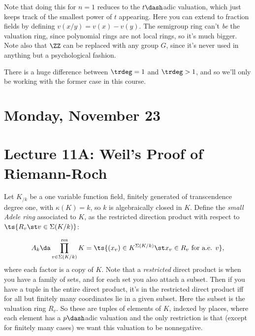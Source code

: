 Note that doing this for \(n=1\) reduces to the \(t\dash\)adic
valuation, which just keeps track of the smallest power of \(t\)
appearing. Here you can extend to fraction fields by defining
\(v(x/y) = v(x) - v(y)\). The semigroup ring can't \emph{be} the
valuation ring, since polynomial rings are not local rings, so it's much
bigger. Note also that \(\ZZ\) can be replaced with any group \(G\),
since it's never used in anything but a psychological fashion.

\begin{slogan}

There is a huge difference between \(\trdeg = 1\) and \(\trdeg > 1\),
and so we'll only be working with the former case in this course.

\end{slogan}

\hypertarget{monday-november-23}{%
\section{Monday, November 23}\label{monday-november-23}}

\hypertarget{lecture-11a-weils-proof-of-riemann-roch}{%
\section{Lecture 11A: Weil's Proof of
Riemann-Roch}\label{lecture-11a-weils-proof-of-riemann-roch}}

Let \(K_{/k}\) be a one variable function field, finitely generated of
transcendence degree one, with \(\kappa(K) = k\), so \(k\) is
algebraically closed in \(K\). Define the \emph{small Adele ring}
associated to \(K\), as the restricted direction product with respect to
\(\ts{R_v \st v\in \Sigma(K/k)}\):

\begin{align*}
A_k \da \prod^{\text{res}}_{v\in \Sigma(K/k)} K
= \ts{(x_v) \in K^{\Sigma(K/k)} \st x_v \in R_v \text{ for a.e. } v }
,\end{align*} where each factor is a copy of \(K\). Note that a
\emph{restricted} direct product is when you have a family of sets, and
for each set you also attach a subset. Then if you have a tuple in the
entire direct product, it's in the restricted direct product iff for all
but finitely many coordinates lie in a given subset. Here the subset is
the valuation ring \(R_v\). So these are tuples of elements of \(K\),
indexed by places, where each element has a \(p\dash\)adic valuation and
the only restriction is that (except for finitely many cases) we want
this valuation to be nonnegative.

